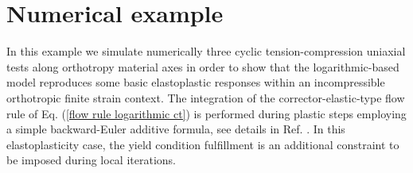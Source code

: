\documentclass[preprint,review,12pt,sort&compress]{elsarticle}%
\begin{document}
\section{Numerical example}

In this example we simulate numerically three cyclic tension-compression
uniaxial tests along orthotropy material axes in order to show that the
logarithmic-based model reproduces some basic elastoplastic responses within
an incompressible orthotropic finite strain context. The integration of the
corrector-elastic-type flow rule of Eq. (\ref{flow rule logarithmic ct}) is
performed during plastic steps employing a simple backward-Euler additive
formula, see details in Ref. \cite{LatMonCM2015}. In this elastoplasticity
case, the yield condition fulfillment is an additional constraint to be
imposed during local iterations.
\end{document}
